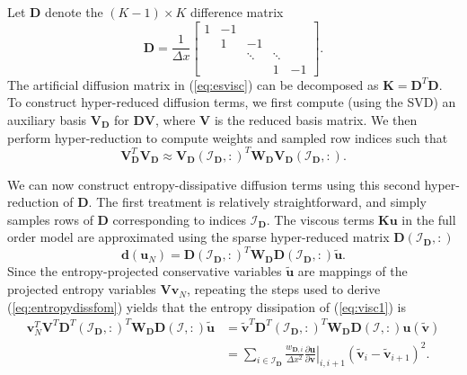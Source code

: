 \documentclass[preprint,10pt]{elsarticle}
\theoremstyle{definition}
\theoremstyle{lemma}
\theoremstyle{theorem}
\theoremstyle{assumption}
\renewcommand{\tilde}{\widetilde}
\newcommand{\pd}[2]{\frac{\partial#1}{\partial#2}}
\newcommand{\LRp}[1]{\left( #1 \right)}
\newcommand{\LRl}[1]{\left. #1 \right|}
\begin{document}
Let $\bm{D}$ denote the $(K-1)\times K$ difference matrix
\[
\bm{D} = \frac{1}{\Delta x}\begin{bmatrix}
1 & -1 &&& \\
 & 1 & -1 && \\
 & & \ddots & \ddots&\\
&  & & 1 & -1
\end{bmatrix}.
\]
The artificial diffusion matrix in (\ref{eq:esvisc}) can be decomposed as $\bm{K} = \bm{D}^T\bm{D}$.  To construct hyper-reduced diffusion terms, we first compute (using the SVD) an auxiliary basis $\bm{V}_{\bm{D}}$ for $\bm{D}\bm{V}$, where $\bm{V}$ is the reduced basis matrix.  We then perform hyper-reduction to compute weights and sampled row indices such that 
\[
\bm{V}_{\bm{D}}^T\bm{V}_{\bm{D}} \approx \bm{V}_{\bm{D}}\LRp{\mathcal{I}_{\bm{D}},:}^T \bm{W}_{\bm{D}}\bm{V}_{\bm{D}}\LRp{\mathcal{I}_{\bm{D}},:}.
\]

We can now construct entropy-dissipative diffusion terms using this second hyper-reduction of $\bm{D}$.  The first treatment is relatively straightforward, and simply samples rows of $\bm{D}$ corresponding to indices $\mathcal{I}_{\bm{D}}$.  The viscous terms $\bm{K}\bm{u}$ in the full order model are approximated using the sparse hyper-reduced matrix $\bm{D}\LRp{\mathcal{I}_{\bm{D}},:}$
\begin{equation}
\bm{d}(\bm{u}_N) = \bm{D}\LRp{\mathcal{I}_{\bm{D}},:}^T \bm{W}_{\bm{D}} \bm{D}\LRp{\mathcal{I}_{\bm{D}},:}\tilde{\bm{u}}.
\label{eq:visc1}
\end{equation}
Since the entropy-projected conservative variables $\tilde{\bm{u}}$ are mappings of the projected entropy variables $\bm{V}\bm{v}_N$, repeating the steps used to derive (\ref{eq:entropydissfom}) yields that the entropy dissipation of (\ref{eq:visc1}) is 
\begin{align*}
\bm{v}_N^T\bm{V}^T\bm{D}^T\LRp{\mathcal{I}_{\bm{D}},:}^T \bm{W}_{\bm{D}} \bm{D}\LRp{\mathcal{I},:}\tilde{\bm{u}} &= 
\tilde{\bm{v}}^T\bm{D}^T\LRp{\mathcal{I}_{\bm{D}},:}^T \bm{W}_{\bm{D}} \bm{D}\LRp{\mathcal{I},:}\bm{u}\LRp{\tilde{\bm{v}}}
\\
&= \sum_{i\in \mathcal{I}_{\bm{D}}} \frac{w_{\bm{D},i}}{\Delta x^2} \LRl{\pd{\bm{u}}{\bm{v}}}_{i,i+1} \LRp{\tilde{\bm{v}}_i - \tilde{\bm{v}}_{i+1}}^2.
\end{align*}
\end{document}
